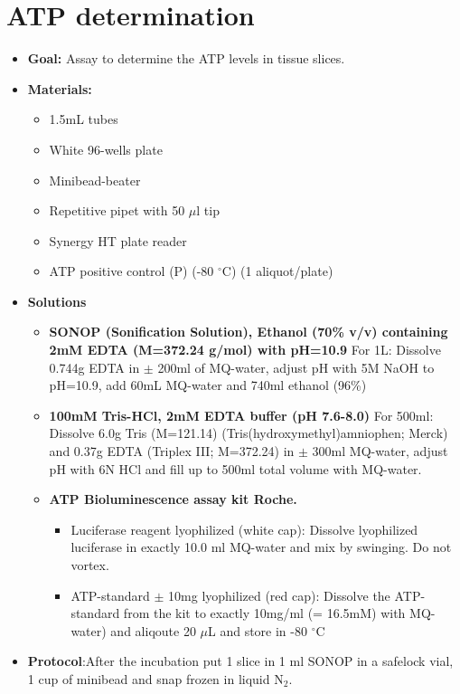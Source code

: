 \documentclass{EU-report}
\begin{document}
\section{ATP determination}
\label{atp}
\begin{itemize}
\item \textbf{Goal:} Assay to determine the ATP levels in tissue slices.
\item \textbf{Materials:}
\begin{itemize}
\item 1.5mL tubes
\item White 96-wells plate
\item Minibead-beater
\item Repetitive pipet with 50 $\mu$l tip
\item Synergy HT plate reader
\item ATP positive control (P) (-80 $^{\circ}$C) (1 aliquot/plate)
\end{itemize}
\item \textbf{Solutions}
\begin{itemize}
\item \textbf{SONOP (Sonification Solution), Ethanol (70\% v/v) containing 2mM EDTA (M=372.24 g/mol) with pH=10.9}
For 1L: Dissolve 0.744g EDTA in $\pm$ 200ml of MQ-water, adjust pH with 5M NaOH to pH=10.9, add 60mL MQ-water and 740ml ethanol (96\%)
\item \textbf{100mM Tris-HCl, 2mM EDTA buffer (pH 7.6-8.0)} For 500ml: Dissolve 6.0g Tris (M=121.14) (Tris(hydroxymethyl)amniophen; Merck) and 0.37g EDTA (Triplex III; M=372.24) in $\pm$ 300ml MQ-water, adjust pH with 6N HCl and fill up to 500ml total volume with MQ-water.
\item \textbf{ATP Bioluminescence assay kit Roche.}
\begin{itemize}
\item Luciferase reagent lyophilized (white cap):
Dissolve lyophilized luciferase in exactly 10.0 ml MQ-water and mix by swinging. Do not vortex.
\item ATP-standard $\pm$ 10mg lyophilized (red cap):
 Dissolve the ATP-standard from the kit to exactly 10mg/ml (= 16.5mM) with MQ-water) and aliqoute 20 $\mu$L and store in -80 $^{\circ}$C
\end{itemize}
\end{itemize}
\item \textbf{Protocol}:After the incubation put 1 slice in 1 ml SONOP in a safelock vial, 1 cup of minibead and snap frozen in liquid N$_2$.
\begin{enumerate}

\end{enumerate}
\end{itemize}
\end{document}

